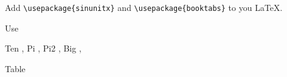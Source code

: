 \documentclass[12pt]{article}
\begin{document}
Add  \verb+\usepackage{sinunitx}+  and \verb+\usepackage{booktabs}+  to you \LaTeX{}.

Use \verb++

Ten ,
Pi ,
Pi2 ,
Big $$,

Table


\end{document}
